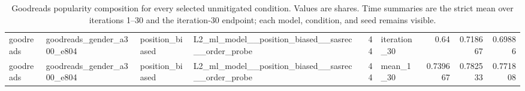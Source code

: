 \begin{table}[htbp!]
\begin{tabular}{llllrlrrr}
goodreads & goodreads\_gender\_a300\_e804 & position\_biased & L2\_ml\_model\_\_position\_biased\_\_sasrec\_\_order\_probe & 44 & iteration\_30 & 0.64 & 0.718667 & 0.69886 \\
goodreads & goodreads\_gender\_a300\_e804 & position\_biased & L2\_ml\_model\_\_position\_biased\_\_sasrec\_\_order\_probe & 44 & mean\_1\_30 & 0.739667 & 0.782533 & 0.771808 \\
\hline
\end{tabular}
\caption{Goodreads popularity composition for every selected unmitigated condition. Values are shares. Time summaries are the strict mean over iterations 1--30 and the iteration-30 endpoint; each model, condition, and seed remains visible.}
\label{chap:results:tab:rq6_goodreads_popularity_summaries}
\end{table}

